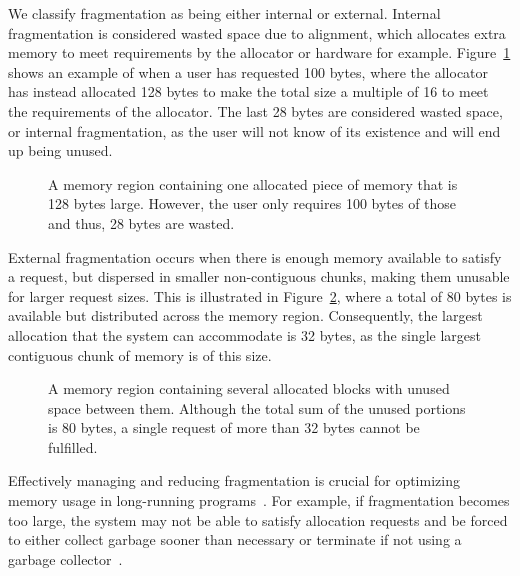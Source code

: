 
We classify fragmentation as being either internal or external. Internal fragmentation is considered wasted space due to alignment, which allocates extra memory to meet requirements by the allocator or hardware for example. Figure~\ref{fig:internal_fragmentation} shows an example of when a user has requested 100 bytes, where the allocator has instead allocated 128 bytes to make the total size a multiple of 16 to meet the requirements of the allocator. The last 28 bytes are considered wasted space, or internal fragmentation, as the user will not know of its existence and will end up being unused.

\begin{figure}[h]
    \centering
    \vspace*{0.2cm}
    
    \vspace*{0.2cm}
    \caption{A memory region containing one allocated piece of memory that is 128 bytes large. However, the user only requires 100 bytes of those and thus, 28 bytes are wasted.}
    \label{fig:internal_fragmentation}
\end{figure}

External fragmentation occurs when there is enough memory available to satisfy a request, but dispersed in smaller non-contiguous chunks, making them unusable for larger request sizes. This is illustrated in Figure~\ref{fig:external_fragmentation}, where a total of 80 bytes is available but distributed across the memory region. Consequently, the largest allocation that the system can accommodate is 32 bytes, as the single largest contiguous chunk of memory is of this size.

\begin{figure}[h]
    \centering
    \vspace*{0.2cm}
    \hspace*{1.2cm}
    
    \vspace*{0.2cm}
    \caption{A memory region containing several allocated blocks with unused space between them. Although the total sum of the unused portions is 80 bytes, a single request of more than 32 bytes cannot be fulfilled.}
    \label{fig:external_fragmentation}
\end{figure}

Effectively managing and reducing fragmentation is crucial for optimizing memory usage in long-running programs~\cite{gchandbook}. For example, if fragmentation becomes too large, the system may not be able to satisfy allocation requests and be forced to either collect garbage sooner than necessary or terminate if not using a garbage collector~\cite{gchandbook}.

